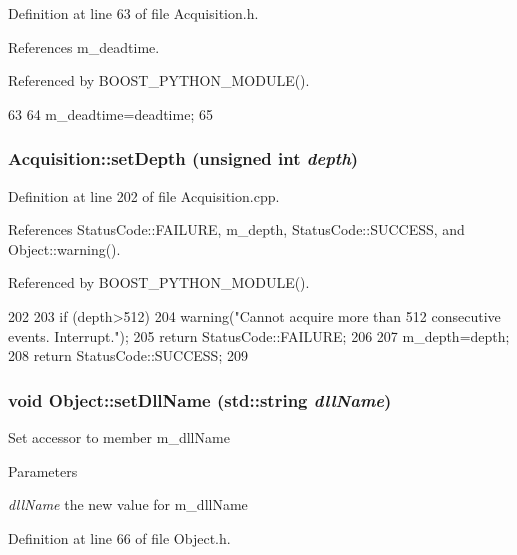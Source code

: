 Definition at line 63 of file Acquisition.h.

References m\_\-deadtime.

Referenced by BOOST\_\-PYTHON\_\-MODULE().


\begin{DoxyCode}
63                                 {
64     m_deadtime=deadtime;
65   }
\end{DoxyCode}
\hypertarget{classAcquisition_a303145d497f99da966fcfd95c00cd81e}{
\subsubsection[{setDepth}]{ Acquisition::setDepth (unsigned int {\em depth})}}
\label{classAcquisition_a303145d497f99da966fcfd95c00cd81e}


Definition at line 202 of file Acquisition.cpp.

References StatusCode::FAILURE, m\_\-depth, StatusCode::SUCCESS, and Object::warning().

Referenced by BOOST\_\-PYTHON\_\-MODULE().


\begin{DoxyCode}
202                                                     {
203   if (depth>512){
204     warning("Cannot acquire more than 512 consecutive events. Interrupt.");
205     return StatusCode::FAILURE;
206   }
207   m_depth=depth;
208   return StatusCode::SUCCESS;
209 }
\end{DoxyCode}
\hypertarget{classObject_a870c5af919958c2136623b2d7816d123}{
\subsubsection[{setDllName}]{\setlength{\rightskip}{0pt plus 5cm}void Object::setDllName (std::string {\em dllName})}}
\label{classObject_a870c5af919958c2136623b2d7816d123}
Set accessor to member m\_\-dllName 
\begin{DoxyParams}{Parameters}
\item[{\em dllName}]the new value for m\_\-dllName \end{DoxyParams}


Definition at line 66 of file Object.h.

